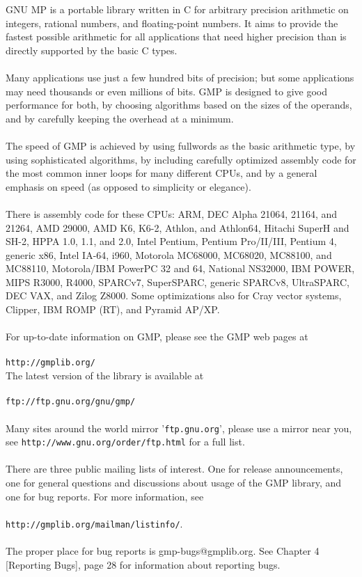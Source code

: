 \documentclass[pdftex,10pt]{article}
\begin{document}
GNU MP is a portable library written in C for arbitrary precision arithmetic on
integers, rational numbers, and floating-point numbers. It aims to provide the
fastest possible arithmetic for all applications that need higher precision
than is directly supported by the basic C types.\\
\\
Many applications use just a few hundred bits of precision; but some
applications may need thousands or even millions of bits. GMP is designed to
give good performance for both, by choosing algorithms based on the sizes of
the operands, and by carefully keeping the overhead at a minimum.\\
\\
The speed of GMP is achieved by using fullwords as the basic arithmetic type,
by using sophisticated algorithms, by including carefully optimized assembly
code for the most common inner loops for many different CPUs, and by a general
emphasis on speed (as opposed to simplicity or elegance).\\
\\
There is assembly code for these CPUs: ARM, DEC Alpha 21064, 21164, and 21264,
AMD 29000, AMD K6, K6-2, Athlon, and Athlon64, Hitachi SuperH and SH-2, HPPA
1.0, 1.1, and 2.0, Intel Pentium, Pentium Pro/II/III, Pentium 4, generic x86,
Intel IA-64, i960, Motorola MC68000, MC68020, MC88100, and MC88110,
Motorola/IBM PowerPC 32 and 64, National NS32000, IBM POWER, MIPS R3000, R4000,
SPARCv7, SuperSPARC, generic SPARCv8, UltraSPARC, DEC VAX, and Zilog Z8000.
Some optimizations also for Cray vector systems, Clipper, IBM ROMP (RT), and
Pyramid AP/XP.\\
\\
For up-to-date information on GMP, please see the GMP web pages at\\
\\
\indent \texttt{http://gmplib.org/}\\

The latest version of the library is available at\\
\\
\texttt{ftp://ftp.gnu.org/gnu/gmp/}\\
\\
Many sites around the world mirror '\texttt{ftp.gnu.org}', please use a mirror
near you, see \texttt{http://www.gnu.org/order/ftp.html} for a full list.\\
\\
There are three public mailing lists of interest. One for release
announcements, one for general questions and discussions about usage of the GMP
library, and one for bug reports. For more information, see\\
\\
\texttt{http://gmplib.org/mailman/listinfo/}.\\
\\
The proper place for bug reports is gmp-bugs@gmplib.org. See Chapter 4
[Reporting Bugs], page 28 for information about reporting bugs.
\end{document}
